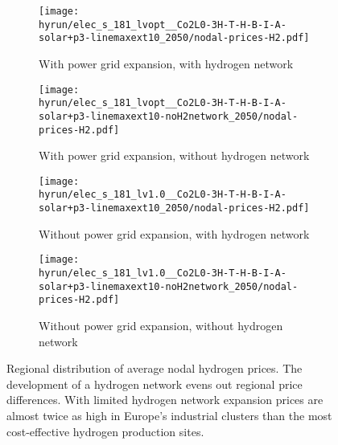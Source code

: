 \begin{figure}
    \begin{subfigure}{0.49\textwidth}
        \centering
        \caption{With power grid expansion, with hydrogen network}
        \texttt{[image: \\hyrun/elec\_s\_181\_lvopt\_\_Co2L0-3H-T-H-B-I-A-solar+p3-linemaxext10\_2050/nodal-prices-H2.pdf]}
    \end{subfigure}
    \begin{subfigure}{0.49\textwidth}
        \centering
        \caption{With power grid expansion, without hydrogen network}
        \texttt{[image: \\hyrun/elec\_s\_181\_lvopt\_\_Co2L0-3H-T-H-B-I-A-solar+p3-linemaxext10-noH2network\_2050/nodal-prices-H2.pdf]}
    \end{subfigure}
    \begin{subfigure}{0.49\textwidth}
        \centering
        \caption{Without power grid expansion, with hydrogen network}
        \texttt{[image: \\hyrun/elec\_s\_181\_lv1.0\_\_Co2L0-3H-T-H-B-I-A-solar+p3-linemaxext10\_2050/nodal-prices-H2.pdf]}
    \end{subfigure}
    \begin{subfigure}{0.49\textwidth}
        \centering
        \caption{Without power grid expansion, without hydrogen network}
        \texttt{[image: \\hyrun/elec\_s\_181\_lv1.0\_\_Co2L0-3H-T-H-B-I-A-solar+p3-linemaxext10-noH2network\_2050/nodal-prices-H2.pdf]}
    \end{subfigure}
    \caption{Regional distribution of average nodal hydrogen prices. The
    development of a hydrogen network evens out regional price differences. With
    limited hydrogen network expansion prices are almost twice as high in
    Europe's industrial clusters than the most cost-effective hydrogen
    production sites.}
    \label{fig:si:lmp-h2}
\end{figure}

